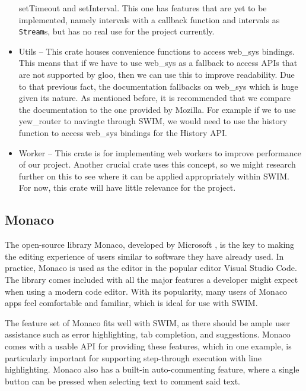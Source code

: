 \documentclass[
    paper=letter,
    parskip=half,
    fontsize=12pt,
    titlepage=firstiscover,
    toc=bibliography,
    numbers=endperiod
]{scrartcl}
\begin{document}
\begin{itemize}
    setTimeout and setInterval. This one has features that are yet to be
    implemented, namely intervals with a callback function and intervals as \texttt{Stream}s,
    but has no real use for the project currently.
    \item Utils -- This crate houses convenience functions to access web\_sys bindings. This means that
    if we have to use web\_sys as a fallback to access APIs that are not
    supported by gloo, then we can use this to improve readability. Due to that previous fact, the
    documentation fallbacks on web\_sys which is huge given its nature.
    As mentioned before, it is recommended that we compare the documentation to
    the one provided by Mozilla. For example if we to use yew\_router to naviagte through SWIM,
    we would need to use the history function to access web\_sys bindings for the History API.
    \item Worker -- This crate is for implementing web workers to improve
    performance of our project. Another crucial crate uses this concept,
    so we might research further on this to see where it can be applied
    appropriately within SWIM. For now, this crate will have little
    relevance for the project.
\end{itemize}

\subsection{Monaco}
\label{subsec:monaco}

The open-source library Monaco, developed by Microsoft \cite{monaco}, is the key to
making the editing experience of users similar to software they have
already used. In practice, Monaco is used as the editor in the popular
editor Visual Studio Code. The library comes included with all the major
features a developer might expect when using a modern code editor. With
its popularity, many users of Monaco apps feel comfortable and familiar,
which is ideal for use with SWIM.

The feature set of Monaco fits well with SWIM, as there should be ample
user assistance such as error highlighting, tab completion, and
suggestions. Monaco comes with a usable API for providing these
features, which in one example, is particularly important for supporting
step-through execution with line highlighting. Monaco also has a
built-in auto-commenting feature, where a single button can be pressed
when selecting text to comment said text.
\end{document}
